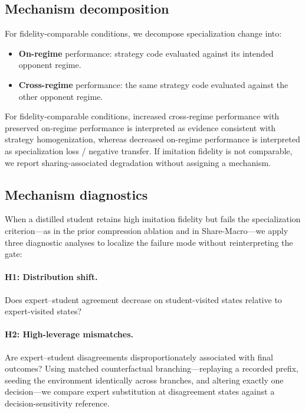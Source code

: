 \subsection{Mechanism decomposition}
\label{sec:decomp}

For fidelity-comparable conditions, we decompose specialization change into:
\begin{itemize}
  \item \textbf{On-regime} performance: strategy code evaluated against its
  intended opponent regime.
  \item \textbf{Cross-regime} performance: the same strategy code evaluated
  against the other opponent regime.
\end{itemize}
For fidelity-comparable conditions, increased cross-regime performance with
preserved on-regime performance is interpreted as evidence consistent with
strategy homogenization, whereas decreased on-regime performance is interpreted
as specialization loss / negative transfer. If imitation fidelity is not
comparable, we report sharing-associated degradation without assigning a
mechanism.

\subsection{Mechanism diagnostics}
\label{sec:diagnostics}

When a distilled student retains high imitation fidelity but fails the
specialization criterion---as in the prior compression ablation and in
Share-Macro---we apply three diagnostic analyses to localize the failure mode
without reinterpreting the gate:

\paragraph{H1: Distribution shift.}
Does expert--student agreement decrease on student-visited states relative to
expert-visited states?

\paragraph{H2: High-leverage mismatches.}
Are expert--student disagreements disproportionately associated with final
outcomes? Using matched counterfactual branching---replaying a recorded prefix,
seeding the environment identically across branches, and altering exactly one
decision---we compare expert substitution at disagreement states against a
decision-sensitivity reference.

